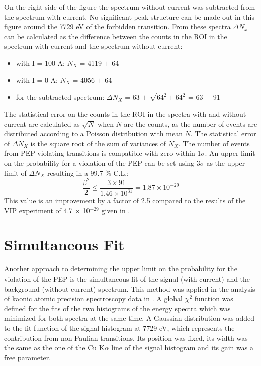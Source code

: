 On the right side of the figure the spectrum without current was subtracted from the spectrum with current. No significant peak structure can be made out in this figure around the 7729 eV of the forbidden transition. From these spectra $\Delta N_{x}$ can be calculated as the difference between the counts in the ROI in the spectrum with current and the spectrum without current:
\begin{itemize}
 \item with I = 100 A: $N_{X}$ = 4119 $\pm$ 64
 \item with I = 0 A: $N_{X}$ = 4056 $\pm$ 64
 \item for the subtracted spectrum: $\Delta N_{X}$ = 63 $\pm$ $\sqrt{\textrm{64}^{2} + \textrm{64}^{2}}$ = 63 $\pm$ 91
\end{itemize}
The statistical error on the counts in the ROI in the spectra with and without current are calculated as $\sqrt{N}$ when $N$ are the counts, as the number of events are distributed according to a Poisson distribution with mean $N$.  The statistical error of $\Delta N_{X}$ is the square root of the sum of variances of $N_{X}$. The number of events from PEP-violating transitions is compatible with zero within 1$\sigma$. An upper limit on the probability for a violation of the PEP can be set using 3$\sigma$ as the upper limit of $\Delta N_{X}$ resulting in a 99.7 \% C.L.:
\begin{equation}
 \frac{\beta^{2}}{2} \leq \frac{3 \times 91}{1.46 \times 10^{31}} = 1.87 \times 10^{-29}
\end{equation} 
This value is an improvement by a factor of 2.5 compared to the results of the VIP experiment of 4.7 $\times$ 10$^{-29}$ given in \cite{Curceanu2011}.

\section{Simultaneous Fit}

Another approach to determining the upper limit on the probability for the violation of the PEP is the simultaneous fit of the signal (with current) and the background (without current) spectrum. This method was applied in the analysis of kaonic atomic precision spectroscopy data in \cite{Bazzi2016}. A global $\chi^{2}$ function was defined for the fits of the two histograms of the energy spectra which was minimized for both spectra at the same time. A Gaussian distribution was added to the fit function of the signal histogram at 7729 eV, which represents the contribution from non-Paulian transitions. Its position was fixed, its width was the same as the one of the Cu K$\alpha$ line of the signal histogram and its gain was a free parameter.

